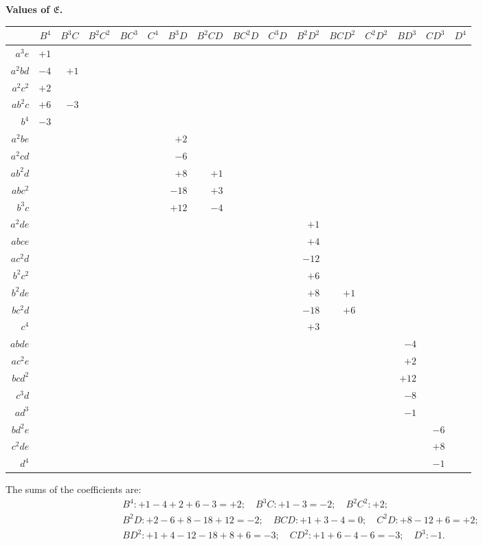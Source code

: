 \documentclass[11pt,a4paper]{book}
\begin{document}
\begin{center}
\renewcommand{\arraystretch}{1.2}
\textbf{Values of $\mathfrak{E}$.}
\begin{tabular}{r|rrrrrrrrrrrrrrr}
& $B^{4}$ & $B^{3}C$ & $B^{2}C^{2}$ & $BC^{3}$ & $C^{4}$ & $B^{3}D$ & $B^{2}CD$ & $BC^{2}D$ & $C^{3}D$ & $B^{2}D^{2}$ & $BCD^{2}$ & $C^{2}D^{2}$ & $BD^{3}$ & $CD^{3}$ & $D^{4}$ \\
\hline
$a^{3}e$ & $+1$ \\
$a^{2}bd$ & $-4$ & $+1$ \\
$a^{2}c^{2}$ & $+2$ \\
$ab^{2}c$ & $+6$ & $-3$ \\
$b^{4}$ & $-3$ \\
$a^{2}be$ & & & & & & $+2$ \\
$a^{2}cd$ & & & & & & $-6$ \\
$ab^{2}d$ & & & & & & $+8$ & $+1$ \\
$abc^{2}$ & & & & & & $-18$ & $+3$ \\
$b^{3}c$ & & & & & & $+12$ & $-4$ \\
$a^{2}de$ & & & & & & & & & & $+1$ \\
$abce$ & & & & & & & & & & $+4$ \\
$ac^{2}d$ & & & & & & & & & & $-12$ \\
$b^{2}c^{2}$ & & & & & & & & & & $+6$ \\
$b^{2}de$ & & & & & & & & & & $+8$ & $+1$ \\
$bc^{2}d$ & & & & & & & & & & $-18$ & $+6$ \\
$c^{4}$ & & & & & & & & & & $+3$ \\
$abde$ & & & & & & & & & & & & & $-4$ \\
$ac^{2}e$ & & & & & & & & & & & & & $+2$ \\
$bcd^{2}$ & & & & & & & & & & & & & $+12$ \\
$c^{3}d$ & & & & & & & & & & & & & $-8$ \\
$ad^{3}$ & & & & & & & & & & & & & $-1$ \\
$bd^{2}e$ & & & & & & & & & & & & & & $-6$ \\
$c^{2}de$ & & & & & & & & & & & & & & $+8$ \\
$d^{4}$ & & & & & & & & & & & & & & $-1$
\end{tabular}
\end{center}

The sums of the coefficients are:
\begin{gather*}
B^{4}: +1-4+2+6-3=+2; \quad B^{3}C: +1-3=-2; \quad B^{2}C^{2}: +2; \\
B^{2}D: +2-6+8-18+12=-2; \quad BCD: +1+3-4=0; \quad C^{2}D: +8-12+6=+2; \\
BD^{2}: +1+4-12-18+8+6=-3; \quad CD^{2}: +1+6-4-6=-3; \quad D^{3}: -1.
\end{gather*}
\end{document}
